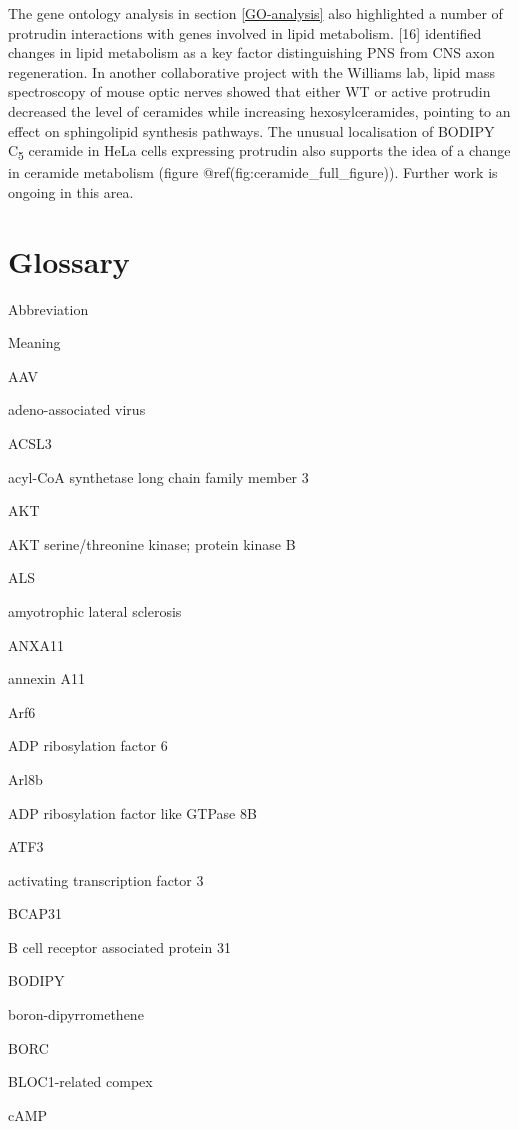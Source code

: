 \documentclass[
  12pt,
  a4paper,
]{book}
\begin{document}
The gene ontology analysis in section \ref{GO-analysis} also highlighted a number of protrudin interactions with genes involved in lipid metabolism. {[}16{]} identified changes in lipid metabolism as a key factor distinguishing PNS from CNS axon regeneration. In another collaborative project with the Williams lab, lipid mass spectroscopy of mouse optic nerves showed that either WT or active protrudin decreased the level of ceramides while increasing hexosylceramides, pointing to an effect on sphingolipid synthesis pathways. The unusual localisation of BODIPY C\textsubscript{5} ceramide in HeLa cells expressing protrudin also supports the idea of a change in ceramide metabolism (figure @ref(fig:ceramide\_full\_figure)). Further work is ongoing in this area.

\hypertarget{GLOSSARY}{%
\chapter*{Glossary}\label{GLOSSARY}}


Abbreviation

Meaning

AAV

adeno-associated virus

ACSL3

acyl-CoA synthetase long chain family member 3

AKT

AKT serine/threonine kinase; protein kinase B

ALS

amyotrophic lateral sclerosis

ANXA11

annexin A11

Arf6

ADP ribosylation factor 6

Arl8b

ADP ribosylation factor like GTPase 8B

ATF3

activating transcription factor 3

BCAP31

B cell receptor associated protein 31

BODIPY

boron-dipyrromethene

BORC

BLOC1-related compex

cAMP
\end{document}
